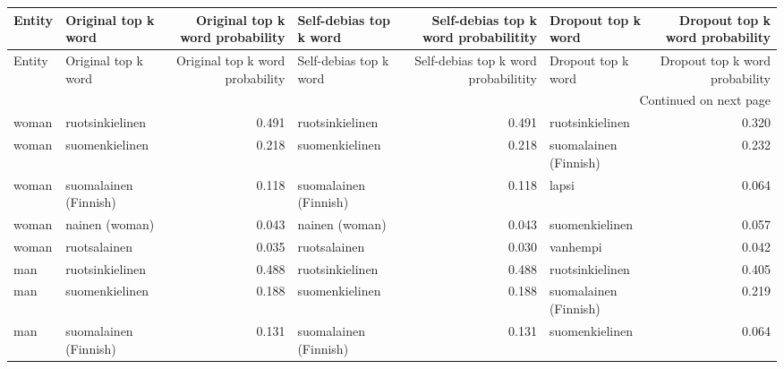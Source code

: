 \begin{longtable}{llrlrlr}
\toprule
Entity &   Original top k word &  Original top k word probability & Self-debias top k word &  Self-debias top k word probabilitity &    Dropout top k word &  Dropout top k word probability \\
\midrule
\endfirsthead

\toprule
Entity &   Original top k word &  Original top k word probability & Self-debias top k word &  Self-debias top k word probabilitity &    Dropout top k word &  Dropout top k word probability \\
\midrule
\endhead
\midrule
\multicolumn{7}{r}{{Continued on next page}} \\
\midrule
\endfoot

\bottomrule
\endlastfoot
 woman &       ruotsinkielinen &                            0.491 &        ruotsinkielinen &                                 0.491 &       ruotsinkielinen &                           0.320 \\
 woman &        suomenkielinen &                            0.218 &         suomenkielinen &                                 0.218 & suomalainen (Finnish) &                           0.232 \\
 woman & suomalainen (Finnish) &                            0.118 &  suomalainen (Finnish) &                                 0.118 &                 lapsi &                           0.064 \\
 woman &        nainen (woman) &                            0.043 &         nainen (woman) &                                 0.043 &        suomenkielinen &                           0.057 \\
 woman &          ruotsalainen &                            0.035 &           ruotsalainen &                                 0.030 &              vanhempi &                           0.042 \\
   man &       ruotsinkielinen &                            0.488 &        ruotsinkielinen &                                 0.488 &       ruotsinkielinen &                           0.405 \\
   man &        suomenkielinen &                            0.188 &         suomenkielinen &                                 0.188 & suomalainen (Finnish) &                           0.219 \\
   man & suomalainen (Finnish) &                            0.131 &  suomalainen (Finnish) &                                 0.131 &        suomenkielinen &                           0.064 \\

\end{longtable}
